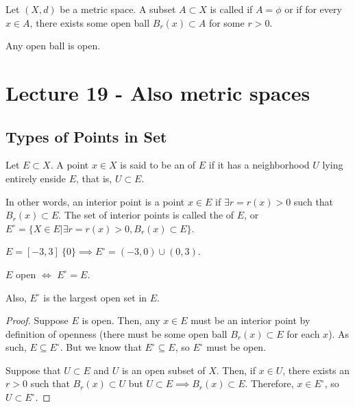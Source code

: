 \documentclass{book}
\begin{document}
\begin{defn}[Openness]
    Let $(X, d)$ be a metric space. A subset $A \subset X$ is called  if $A = \phi$ or if for every $x \in A$, there exists some open ball $B_r(x) \subset A$ for some $r > 0$.
\end{defn}

\begin{thm}
    Any open ball is open.
\end{thm}

\section{Lecture 19 - Also metric spaces}
\subsection{Types of Points in Set}
\begin{defn}
    Let $E \subset X$. A point $x \in X$ is said to be an  of $E$ if it has a neighborhood $U$ lying entirely enside $E$, that is, $U \subset E$.
\end{defn}

In other words, an interior point is a point $x \in E$ if $\exists r = r(x) > 0$ such that $B_r(x) \subset E$. The set of interior points is called the  of $E$, or $E^\circ = \{ X \in E | \exists r = r(x) > 0, B_r(x) \subset E\}$.

\begin{ex}
    $E = [-3, 3] \ \{0\} \implies E^\circ = (-3, 0) \cup (0, 3)$. 
\end{ex}

\begin{thm}
    $E$ open $\iff$ $E^\circ = E$.

    Also, $E^\circ$ is the largest open set in $E$.
\end{thm}

\begin{proof}
    Suppose $E$ is open. Then, any $x \in E$ must be an interior point by definition of openness (there must be some open ball $B_r(x) \subset E$ for each $x$). As such, $E \subseteq E^\circ$. But we know that $E^\circ \subseteq E$, so $E^\circ$ must be open.

    Suppose that $U \subset E$ and $U$ is an open subset of $X$. Then, if $x \in U$, there exists an $r > 0$ such that $B_r(x) \subset U$ but $U \subset E \implies B_r(x) \subset E$. Therefore, $x \in E^\circ$, so $U \subset E^\circ$. 
\end{proof}
\end{document}
